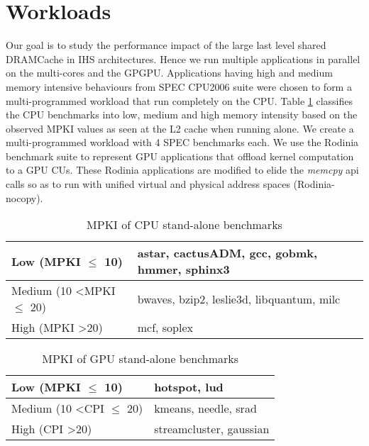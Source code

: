 \section{Workloads} 
Our goal is to study the performance impact of the large last level shared DRAMCache in IHS architectures. Hence we run multiple applications in parallel on the multi-cores and the GPGPU. Applications having high and medium memory intensive behaviours from SPEC CPU2006 suite \cite{spec2006} were chosen to form a multi-programmed workload that run completely on the CPU. Table \ref{single-cpu-mpki} classifies the CPU benchmarks into low, medium and high memory intensity based on the observed MPKI values as seen at the L2 cache when running alone. We create a multi-programmed workload with 4 SPEC benchmarks each. We use the Rodinia benchmark suite \cite{rodinia} to represent GPU applications that offload kernel computation to a GPU CUs. These Rodinia applications are modified to elide the \textit{memcpy} api calls so as to run with unified virtual and physical address spaces (Rodinia-nocopy). 

\begin{table}[htb]
	\centering
	\begin{tabular}{|l|l|}
		\hline
		Low (MPKI $\leq$ 10)          \hspace{5em}      & astar, cactusADM, gcc, gobmk, hmmer, sphinx3    \\ \hline
		Medium (10 \textless MPKI $\leq$ 20) & bwaves, bzip2, leslie3d, libquantum, milc \\ \hline
		High (MPKI \textgreater 20)            & mcf, soplex       \\ \hline
	\end{tabular}
	\caption{MPKI of CPU stand-alone benchmarks}
	\label{single-cpu-mpki}
\end{table}

\begin{table}[htb]
	\centering
	\begin{tabular}{|l|l|}
		\hline
		Low (MPKI $\leq$ 10)                & hotspot, lud           \\ \hline
		Medium (10 \textless CPI $\leq$ 20) &  kmeans, needle, srad   \\ \hline
		High (CPI \textgreater 20)            & streamcluster, gaussian       \\ \hline
	\end{tabular}
	\caption{MPKI of GPU stand-alone benchmarks}
	\label{single-gpu-mpki}
\end{table}

